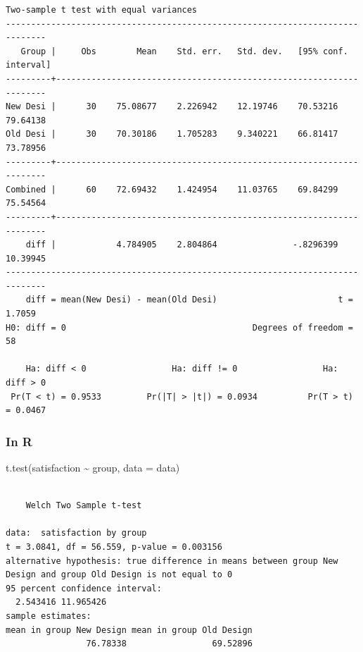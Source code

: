 \documentclass[
  letterpaper,
  DIV=11,
  numbers=noendperiod]{scrreprt}
\newenvironment{Shaded}{\begin{snugshade}}{\end{snugshade}}
\newcommand{\AttributeTok}[1]{\textcolor[rgb]{0.40,0.45,0.13}{#1}}
\newcommand{\FunctionTok}[1]{\textcolor[rgb]{0.28,0.35,0.67}{#1}}
\newcommand{\NormalTok}[1]{\textcolor[rgb]{0.00,0.23,0.31}{#1}}
\newcommand{\SpecialCharTok}[1]{\textcolor[rgb]{0.37,0.37,0.37}{#1}}
\begin{document}
\begin{verbatim}
Two-sample t test with equal variances
------------------------------------------------------------------------------
   Group |     Obs        Mean    Std. err.   Std. dev.   [95% conf. interval]
---------+--------------------------------------------------------------------
New Desi |      30    75.08677    2.226942    12.19746    70.53216    79.64138
Old Desi |      30    70.30186    1.705283    9.340221    66.81417    73.78956
---------+--------------------------------------------------------------------
Combined |      60    72.69432    1.424954    11.03765    69.84299    75.54564
---------+--------------------------------------------------------------------
    diff |            4.784905    2.804864               -.8296399    10.39945
------------------------------------------------------------------------------
    diff = mean(New Desi) - mean(Old Desi)                        t =   1.7059
H0: diff = 0                                     Degrees of freedom =       58

    Ha: diff < 0                 Ha: diff != 0                 Ha: diff > 0
 Pr(T < t) = 0.9533         Pr(|T| > |t|) = 0.0934          Pr(T > t) = 0.0467
\end{verbatim}

\subsubsection{In R}\label{in-r-2}

\begin{Shaded}
\begin{Highlighting}[]
\FunctionTok{t.test}\NormalTok{(satisfaction }\SpecialCharTok{\textasciitilde{}}\NormalTok{ group, }\AttributeTok{data =}\NormalTok{ data)}
\end{Highlighting}
\end{Shaded}

\begin{verbatim}

    Welch Two Sample t-test

data:  satisfaction by group
t = 3.0841, df = 56.559, p-value = 0.003156
alternative hypothesis: true difference in means between group New Design and group Old Design is not equal to 0
95 percent confidence interval:
  2.543416 11.965426
sample estimates:
mean in group New Design mean in group Old Design 
                76.78338                 69.52896 
\end{verbatim}
\end{document}
